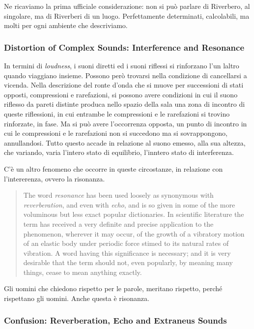 \begin{refsection}
Ne ricaviamo la prima ufficiale considerazione: non si può parlare di Riverbero,
al singolare, ma di Riverberi di un luogo. Perfettamente determinati, calcolabili,
ma molti per ogni ambiente che descriviamo.

\subsubsection{Distortion of Complex Sounds: Interference and Resonance}

In termini di \emph{loudness}, i suoni diretti ed i suoni riflessi si rinforzano
l'un laltro quando viaggiano insieme. Possono però trovarsi nella condizione di
cancellarsi a vicenda. Nella descrizione del ronte d'onda che si muove per
successioni di stati opposti, compressioni e rarefazioni, si possono avere
condizioni in cui il suono riflesso da pareti distinte produca nello spazio della
sala una zona di incontro di queste riflessioni, in cui entrambe le compressioni e
le rarefazioni si trovino rinforzate, in fase. Ma si può avere l'occorrenza opposta,
un punto di incontro in cui le compressioni e le rarefazioni non si succedono ma
si sovrappongono, annullandosi. Tutto questo accade in relazione al suono emesso,
alla sua altezza, che variando, varia l'intero stato di equilibrio, l'inntero stato
di interferenza.

C'è un altro fenomeno che occorre in queste circostanze, in relazione con
l'intererenza, ovvero la risonanza.

\begin{quote}
  The word \emph{resonance} has been used loosely as synonymous with
  \emph{reverberation}, and even with \emph{echo}, and is so given in some of
  the more voluminous but less exact popular dictionaries. In scientific
  literature the term has received a very definite and precise application to
  the phenomenon, wherever it may occur, of the growth of a vibratory motion of
  an elastic body under periodic force stimed to its natural rates of vibration.
  A word having this significance is necessary; and it is very desirable that
  the term should not, even popularly, by meaning many things, cease to mean
  anything exactly. \cite{ws:rev}
\end{quote}

Gli uomini che chiedono rispetto per le parole, meritano rispetto, perché
rispettano gli uomini. Anche questa è risonanza.

\subsubsection{Confusion: Reverberation, Echo and Extraneus Sounds}


\end{refsection}
